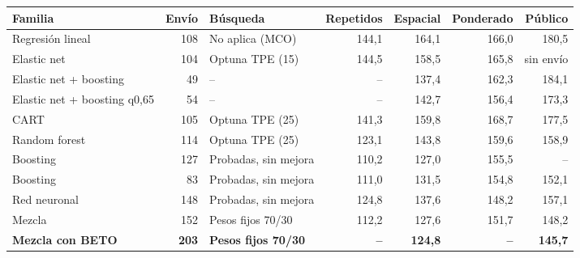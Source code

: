 \begin{tabular}{lrlrrrr}
\toprule
Familia & Envío & Búsqueda & Repetidos & Espacial & Ponderado & Público \\
\midrule
Regresión lineal & 108 & No aplica (MCO) & 144,1 & 164,1 & 166,0 & 180,5 \\
Elastic net & 104 & Optuna TPE (15) & 144,5 & 158,5 & 165,8 & sin envío \\
Elastic net + boosting & 49 & -- & -- & 137,4 & 162,3 & 184,1 \\
Elastic net + boosting q0,65 & 54 & -- & -- & 142,7 & 156,4 & 173,3 \\
CART & 105 & Optuna TPE (25) & 141,3 & 159,8 & 168,7 & 177,5 \\
Random forest & 114 & Optuna TPE (25) & 123,1 & 143,8 & 159,6 & 158,9 \\
Boosting & 127 & Probadas, sin mejora & 110,2 & 127,0 & 155,5 & -- \\
Boosting & 83 & Probadas, sin mejora & 111,0 & 131,5 & 154,8 & 152,1 \\
Red neuronal & 148 & Probadas, sin mejora & 124,8 & 137,6 & 148,2 & 157,1 \\
Mezcla & 152 & Pesos fijos 70/30 & 112,2 & 127,6 & 151,7 & 148,2 \\
\textbf{Mezcla con BETO} & \textbf{203} & \textbf{Pesos fijos 70/30} & \textbf{--} & \textbf{124,8} & \textbf{--} & \textbf{145,7} \\
\bottomrule
\end{tabular}
